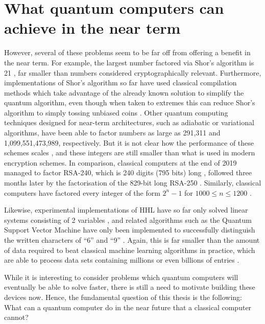 \section{What quantum computers can achieve in the near term}
\label{sec:near-term-power}

However, several of these problems seem to be far off from offering a benefit in the near term. For example, the largest number factored via Shor's algorithm is 21 \cite{vandersypen2001, lanyon2007, lu2007, politi2009, lucero2012, martinlopez2012}, far smaller than numbers considered cryptographically relevant. Furthermore, implementations of Shor's algorithm so far have used classical compilation methods which take advantage of the already known solution to simplify the quantum algorithm, even though when taken to extremes this can reduce Shor's algorithm to simply tossing unbiased coins \cite{smolin2013}. Other quantum computing techniques designed for near-term architectures, such as adiabatic \cite{xu2012, dattani2014, dridi2017, li2017} or variational \cite{anschuetz2018, crane2019} algorithms, have been able to factor numbers as large as 291,311 and 1,099,551,473,989, respectively. But it is not clear how the performance of these schemes scales \cite{aaronson2019mottebailey}, and these integers are still smaller than what is used in modern encryption schemes. In comparison, classical computers at the end of 2019 managed to factor RSA-240, which is 240 digits (795 bits) long \cite{boudot2019}, followed three months later by the factorisation of the 829-bit long RSA-250 \cite{boudot2020}. Similarly, classical computers have factored every integer of the form $2^n-1$ for $1000 \leq n\leq 1200$ \cite{kleinjung2015}.

Likewise, experimental implementations of HHL have so far only solved linear systems consisting of 2 variables \cite{cai2013, pan2014, barz2014}, and related algorithms such as the Quantum Support Vector Machine have only been implemented to successfully distinguish the written characters of ``6'' and ``9'' \cite{li2015}. Again, this is far smaller than the amount of data required to beat classical machine learning algorithms in practice, which are able to process data sets containing millions or even billions of entries \cite{googledatasets}.

While it is interesting to consider problems which quantum computers will eventually be able to solve faster, there is still a need to motivate building these devices now. Hence, the fundamental question of this thesis is the following: What can a quantum computer do in the near future that a classical computer cannot?

